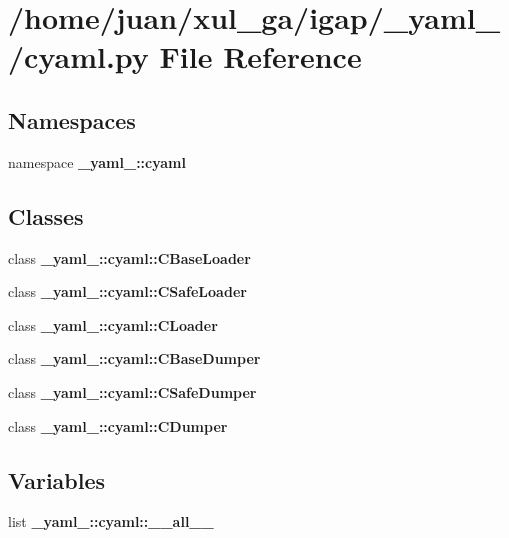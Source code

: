 \section{/home/juan/xul\_\-ga/igap/\_\-yaml\_\-/cyaml.py File Reference}
\label{cyaml_8py}
\subsection*{Namespaces}
\begin{CompactItemize}
\item 
namespace {\bf \_\-yaml\_\-::cyaml}
\end{CompactItemize}
\subsection*{Classes}
\begin{CompactItemize}
\item 
class {\bf \_\-yaml\_\-::cyaml::CBaseLoader}
\item 
class {\bf \_\-yaml\_\-::cyaml::CSafeLoader}
\item 
class {\bf \_\-yaml\_\-::cyaml::CLoader}
\item 
class {\bf \_\-yaml\_\-::cyaml::CBaseDumper}
\item 
class {\bf \_\-yaml\_\-::cyaml::CSafeDumper}
\item 
class {\bf \_\-yaml\_\-::cyaml::CDumper}
\end{CompactItemize}
\subsection*{Variables}
\begin{CompactItemize}
\item 
list {\bf \_\-yaml\_\-::cyaml::\_\-\_\-all\_\-\_\-}
\end{CompactItemize}
